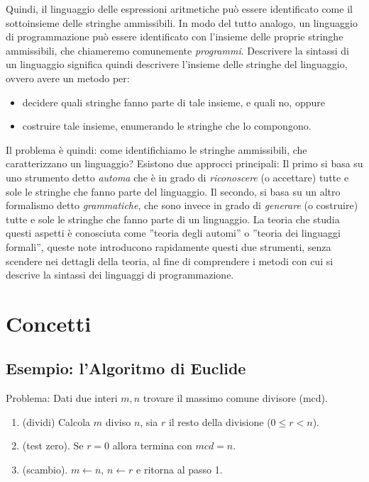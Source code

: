 Quindi, il linguaggio delle espressioni aritmetiche può essere identificato come il sottoinsieme delle stringhe ammissibili. In modo del tutto analogo, un linguaggio di programmazione può essere identificato con l'insieme delle proprie stringhe ammissibili, che chiameremo comunemente \emph{programmi}. Descrivere la sintassi di un linguaggio significa quindi descrivere l'insieme delle stringhe del linguaggio, ovvero avere un metodo per:

\begin{itemize}
\item decidere quali stringhe fanno parte di tale insieme, e quali no, oppure
\item costruire tale insieme, enumerando le stringhe che lo compongono.
\end{itemize}

Il problema è quindi: come identifichiamo le stringhe ammissibili, che caratterizzano un linguaggio?
Esistono due approcci principali: Il primo si basa su uno strumento detto \emph{automa} che è in grado di
\emph{riconoscere} (o accettare) tutte e sole le stringhe che fanno parte del linguaggio.  Il secondo, si basa su un altro formalismo detto \emph{grammatiche}, che sono invece in grado di \emph{generare} (o costruire) tutte e sole le stringhe che fanno parte di un linguaggio. La teoria che studia questi aspetti è conosciuta come ''teoria degli automi'' o ''teoria dei linguaggi formali'', queste note introducono rapidamente questi due strumenti, senza scendere nei dettagli della teoria, al fine di comprendere i metodi con cui si descrive la sintassi dei linguaggi di programmazione.



\section{Concetti}

\subsection{Esempio: l'Algoritmo di Euclide}

Problema: Dati due interi $m,n$ trovare il massimo comune divisore
(mcd).

\begin{enumerate}
\item (dividi) Calcola $m$ diviso $n$, sia $r$ il resto della divisione ($0 \leq r < n$).
\item (test zero). Se $r = 0$ allora termina con $mcd = n$.
\item (scambio). $m \leftarrow n$, $n \leftarrow r$ e ritorna al passo 1.
\end{enumerate}


